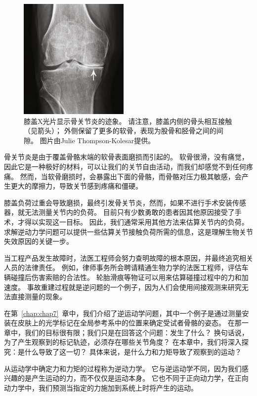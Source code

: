 \begin{figure}[!htb]
	\centering
	\includegraphics[width=0.4\linewidth]{chap8/8_1}
	\caption{膝盖X光片显示骨关节炎的迹象。
		请注意，膝盖内侧的骨头相互接触（见箭头）；
		外侧保留了更多的软骨，表现为股骨和胫骨之间的间隙。
		图片由Julie Thompson-Kolesar提供。 \label{fig:8_1}}
\end{figure}


骨关节炎是由于覆盖骨骼末端的软骨表面磨损而引起的。
软骨很滑，没有痛觉，因此它是一种极好的材料，可以让我们的关节自由活动，而我们却感觉不到任何疼痛。
然而，当软骨磨损时，会暴露出下面的骨骼，而骨骼对压力极其敏感，会产生更大的摩擦力，导致关节感到疼痛和僵硬。


膝盖负荷过重会导致磨损，最终引发骨关节炎，然而，如果不进行手术安装传感器，就无法测量关节内的负荷。
目前只有少数勇敢的患者因其他原因接受了手术，才得以实现这一目标。
因此，我们通常采用其他方法来估算关节内的负荷。
求解逆动力学问题可以提供一些估算关节接触负荷所需的信息，这是理解生物关节失效原因的关键一步。


当工程产品发生故障时，法医工程师会努力查明故障的根本原因，并最终追究相关人员的法律责任。
例如，律师事务所会聘请精通生物力学的法医工程师，评估车辆碰撞后伤害索赔的合法性。
轮胎滑痕等物证可以用来估算碰撞过程中的力和加速度。
事故重建过程就是逆问题的一个例子，因为人们会使用间接观测来研究无法直接测量的现象。


在第~\ref{chap:chap7}~章中，我们介绍了逆运动学问题，其中一个例子是通过测量安装在皮肤上的光学标记在全局参考系中的位置来确定受试者骨骼的姿态。
在那一章中，我们的目标很有限；我们只是在回答这个问题：发生了什么？
换句话说，为了产生观察到的标记轨迹，必须存在哪些关节角度？
在本章中，我们将深入探究：是什么导致了这一切？
具体来说，是什么力和力矩导致了观察到的运动？


从运动学中确定力和力矩的过程称为逆动力学。
它与逆运动学不同，因为我们感兴趣的是产生运动的力，而不仅仅是运动本身。
它也不同于正向动力学，在正向动力学中，我们预测当指定的力施加到系统上时将产生的运动。


